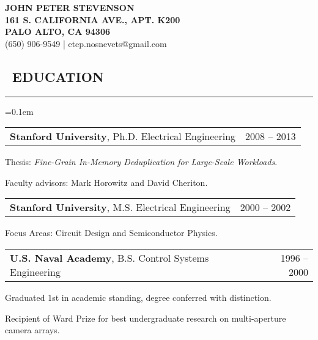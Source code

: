 \documentclass[10pt,letterpaper]{article}
\makeatletter
\newenvironment{changemargin}[2]
{%
    \begin{list}{}{%
        \setlength{\topsep}{0pt}%
        \setlength{\leftmargin}{#1}%
        \setlength{\rightmargin}{#2}%
        \setlength{\listparindent}{\parindent}%
        \setlength{\itemindent}{\parindent}%
        \setlength{\parsep}{\parskip}%
    }%
    \item[]
}%
{%
    \end{list}
}%
\newenvironment{content}
{%
    \begin{changemargin}{0cm}{2.5cm}
    \begin{itemize*}
        \vspace{-0.15em}
}%
{%
    \end{itemize*}
    \end{changemargin}
}%
\newenvironment{resumesection}[1]
{%
    \subsection*{\ #1}
    \vspace{-0.4em}
    \hrule
    \vspace{+0.4em}
    \begin{itemize}
        \parskip=0.1em
}%
{%
    \end{itemize}
}%
\newcommand{\headerrowx}[2]
{\item[] \begin{tabular*}{\linewidth}{l@{\extracolsep{\fill}}r}
	#1 &
	#2 \\
\end{tabular*}}
\makeatother
\begin{document}
\begin{center}
{\LARGE{ \textbf{JOHN PETER STEVENSON}}} \\
\vspace{0.5em}
\footnotesize{\textbf{161 S. CALIFORNIA AVE., APT. K200}}  \\
\footnotesize{\textbf{PALO ALTO, CA 94306              }}  \\
\footnotesize{{(650) 906-9549} | {etep.nosnevets@gmail.com}}
\end{center}

\begin{resumesection}{EDUCATION}
    \headerrowx{ \textbf{Stanford University}, Ph.D. Electrical Engineering} {2008 -- 2013}
    \begin{content}
        \item[] Thesis: \emph{Fine-Grain In-Memory Deduplication for Large-Scale Workloads}.
        \item[] Faculty advisors: Mark Horowitz and David Cheriton.
    \end{content}
    
    \headerrowx{ \textbf{Stanford University}, M.S. Electrical Engineering} {2000 -- 2002}
    \begin{content}
    	\item[] Focus Areas: Circuit Design and Semiconductor Physics.
    \end{content}
    
    \headerrowx{ \textbf{U.S. Naval Academy}, B.S. Control Systems Engineering} {1996 -- 2000}
    \begin{content}
    	\item[] Graduated 1st in academic standing, degree conferred with distinction.
    	\item[] Recipient of Ward Prize for best undergraduate research on multi-aperture camera arrays.
    \end{content}
\end{resumesection}
\end{document}
